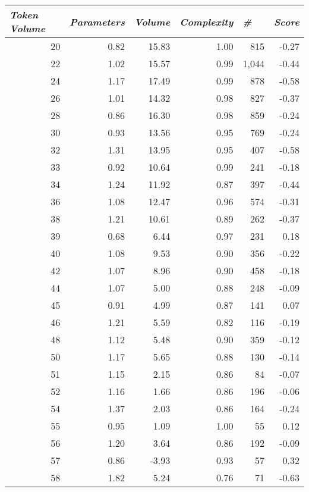 \begin{appendices}
\begin{longtable}[c]{@{}rrrrrr@{}}
\toprule
\multicolumn{1}{l}{\textit{\textbf{Token Volume}}} & \multicolumn{1}{l}{\textit{\textbf{Parameters}}} & \multicolumn{1}{l}{\textit{\textbf{Volume}}} & \multicolumn{1}{l}{\textit{\textbf{Complexity}}} & \multicolumn{1}{l}{\textit{\textbf{\#}}} & \multicolumn{1}{l}{\textit{\textbf{Score}}} \\* \midrule
\endfirsthead
%
\endhead
%
\bottomrule
\endfoot
%
\endlastfoot
%
20 & 0.82 & 15.83 & 1.00 & 815 & -0.27 \\
22 & 1.02 & 15.57 & 0.99 & 1,044 & -0.44 \\
24 & 1.17 & 17.49 & 0.99 & 878 & -0.58 \\
26 & 1.01 & 14.32 & 0.98 & 827 & -0.37 \\
28 & 0.86 & 16.30 & 0.98 & 859 & -0.24 \\
30 & 0.93 & 13.56 & 0.95 & 769 & -0.24 \\
32 & 1.31 & 13.95 & 0.95 & 407 & -0.58 \\
33 & 0.92 & 10.64 & 0.99 & 241 & -0.18 \\
34 & 1.24 & 11.92 & 0.87 & 397 & -0.44 \\
36 & 1.08 & 12.47 & 0.96 & 574 & -0.31 \\
38 & 1.21 & 10.61 & 0.89 & 262 & -0.37 \\
39 & 0.68 & 6.44 & 0.97 & 231 & 0.18 \\
40 & 1.08 & 9.53 & 0.90 & 356 & -0.22 \\
42 & 1.07 & 8.96 & 0.90 & 458 & -0.18 \\
44 & 1.07 & 5.00 & 0.88 & 248 & -0.09 \\
45 & 0.91 & 4.99 & 0.87 & 141 & 0.07 \\
46 & 1.21 & 5.59 & 0.82 & 116 & -0.19 \\
48 & 1.12 & 5.48 & 0.90 & 359 & -0.12 \\
50 & 1.17 & 5.65 & 0.88 & 130 & -0.14 \\
51 & 1.15 & 2.15 & 0.86 & 84 & -0.07 \\
52 & 1.16 & 1.66 & 0.86 & 196 & -0.06 \\
54 & 1.37 & 2.03 & 0.86 & 164 & -0.24 \\
55 & 0.95 & 1.09 & 1.00 & 55 & 0.12 \\
56 & 1.20 & 3.64 & 0.86 & 192 & -0.09 \\
57 & 0.86 & -3.93 & 0.93 & 57 & 0.32 \\
58 & 1.82 & 5.24 & 0.76 & 71 & -0.63 \\

\end{longtable}
\end{appendices}
